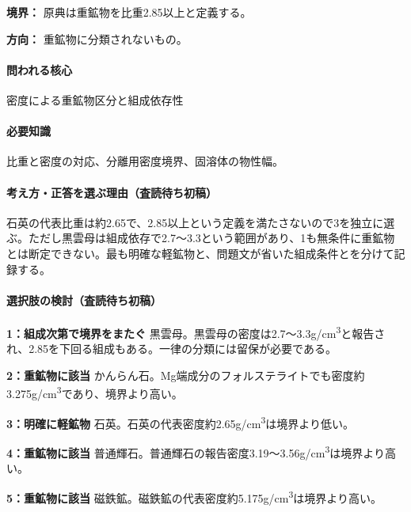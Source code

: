 \noindent\textbf{境界：} 原典は重鉱物を比重2.85以上と定義する。\par

\noindent\textbf{方向：} 重鉱物に分類されないもの。\par

\paragraph{問われる核心} 密度による重鉱物区分と組成依存性

\paragraph{必要知識} 比重と密度の対応、分離用密度境界、固溶体の物性幅。

\paragraph{考え方・正答を選ぶ理由（査読待ち初稿）} 石英の代表比重は約2.65で、2.85以上という定義を満たさないので3を独立に選ぶ。ただし黒雲母は組成依存で2.7〜3.3という範囲があり、1も無条件に重鉱物とは断定できない。最も明確な軽鉱物と、問題文が省いた組成条件とを分けて記録する。

\paragraph{選択肢の検討（査読待ち初稿）}\mbox{}\par

\noindent\textbf{1：組成次第で境界をまたぐ} 黒雲母。黒雲母の密度は2.7〜3.3g/cm\textsuperscript{3}と報告され、2.85を下回る組成もある。一律の分類には留保が必要である。\par

\noindent\textbf{2：重鉱物に該当} かんらん石。Mg端成分のフォルステライトでも密度約3.275g/cm\textsuperscript{3}であり、境界より高い。\par

\noindent\textbf{3：明確に軽鉱物} 石英。石英の代表密度約2.65g/cm\textsuperscript{3}は境界より低い。\par

\noindent\textbf{4：重鉱物に該当} 普通輝石。普通輝石の報告密度3.19〜3.56g/cm\textsuperscript{3}は境界より高い。\par

\noindent\textbf{5：重鉱物に該当} 磁鉄鉱。磁鉄鉱の代表密度約5.175g/cm\textsuperscript{3}は境界より高い。\par

